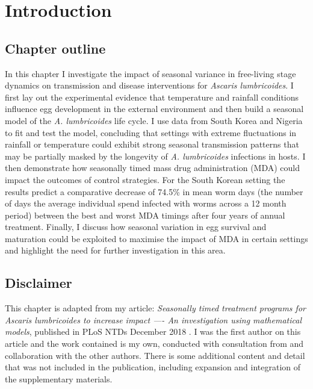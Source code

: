 
\section{Introduction}

\subsection{Chapter outline}

In this chapter I investigate the impact of seasonal variance in free-living stage dynamics on transmission and disease interventions for \textit{Ascaris lumbricoides}. I first lay out the experimental evidence that temperature and rainfall conditions influence egg development in the external environment and then build a seasonal model of the \textit{A. lumbricoides} life cycle. I use data from South Korea and Nigeria to fit and test the model, concluding that settings with extreme fluctuations in rainfall or temperature could exhibit strong seasonal transmission patterns that may be partially masked by the longevity of \textit{A. lumbricoides} infections in hosts. I then demonstrate how seasonally timed mass drug administration (MDA) could impact the outcomes of control strategies. For the South Korean setting the results predict a comparative decrease of 74.5\% in mean worm days (the number of days the average individual spend infected with worms across a 12 month period) between the best and worst MDA timings after four years of annual treatment. Finally, I discuss how seasonal variation in egg survival and maturation could be exploited to maximise the impact of MDA in certain settings and highlight the need for further investigation in this area.

\subsection{Disclaimer}

This chapter is adapted from my article: \textit{Seasonally timed treatment programs for Ascaris lumbricoides to increase impact —- An investigation using mathematical models}, published in PLoS NTDs December 2018 \cite{Davis2018}. I was the first author on this article and the work contained is my own, conducted with consultation from and collaboration with the other authors. There is some additional content and detail that was not included in the publication, including expansion and integration of the supplementary materials.

